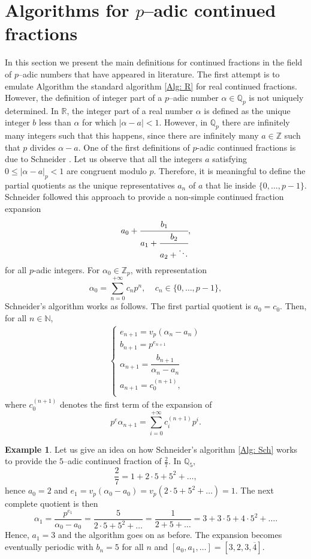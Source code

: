 \documentclass[12pt, reqno]{amsart}
\theoremstyle{plain}
\theoremstyle{definition}
\newtheorem{Example}[Theorem]{Example}
\begin{document}
\section{Algorithms for $p$--adic continued fractions}\label{Sec: algo}
In this section we present the main definitions for continued fractions in the field of $p$--adic numbers that have appeared in literature. The first attempt is to emulate Algorithm  the standard algorithm \eqref{Alg: R} for real continued fractions. However, the definition of integer part of a $p$--adic number $\alpha\in\mathbb{Q}_p$ is not uniquely determined. In $\mathbb{R}$, the integer part of a real number $\alpha$ is defined as the unique integer $b$ less than $\alpha$ for which $|\alpha-a|<1$. However, in $\mathbb{Q}_p$ there are infinitely many integers such that this happens, since there are infinitely many $a\in\mathbb{Z}$ such that $p$ divides $\alpha-a$. One of the first definitions of $p$-adic continued fractions is due to Schneider \cite{SCH}. Let us observe that all the integers $a$ satisfying $0\leq |\alpha -a|_p<1$ are congruent modulo $p$. Therefore, it is meaningful to define the partial quotients as the unique representatives $a_n$ of $a$ that lie inside $\{0,\ldots,p-1\}$. Schneider followed this approach to provide a non-simple continued fraction expansion
 \begin{equation}
a_0+\cfrac{b_1}{a_1+\cfrac{b_2}{a_2+\ddots}},
\end{equation}
for all $p$-adic integers. For $\alpha_0\in \mathbb{Z}_{p}$, with representation
\[\alpha_0=\sum\limits_{n=0}^{+\infty}c_np^n, \ \ \ \ \ c_n\in\{0,\ldots,p-1\},\]
Schneider's algorithm works as follows. The first partial quotient is $a_0=c_0$. Then, for all $n\in\mathbb{N}$,
\begin{align} 
\begin{cases}\label{Alg: Sch}
e_{n+1}=v_p(\alpha_{n}-a_n)\\
b_{n+1}=p^{e_{n+1}}\\
\alpha_{n+1}=\dfrac{b_{n+1}}{\alpha_n-a_n}\\
a_{n+1}=c_0^{(n+1)},\\
\end{cases}
\end{align}
where $c_0^{(n+1)}$ denotes the first term of the expansion of
\[p^e\alpha_{n+1}=\sum\limits_{i=0}^{+\infty}c_i^{(n+1)}p^i.\]
\begin{Example}
Let us give an idea on how Schneider's algorithm \eqref{Alg: Sch} works to provide the $5$--adic continued fraction of $\frac{2}{7}$. In $\mathbb{Q}_5$,
\[\frac{2}{7}=1+2\cdot5+5^2+\ldots,\]
hence $a_0=2$ and $e_1=v_p(\alpha_0-a_0)=v_p(2\cdot5+5^2+\ldots)=1$.
The next complete quotient is then
\[\alpha_1=\frac{p^{e_1}}{\alpha_0-a_0}=\frac{5}{2\cdot5+5^2+\ldots}=\frac{1}{2+5+\ldots}=3+3\cdot5+4\cdot 5^2+\ldots.\]
Hence, $a_1=3$ and the algorithm goes on as before. The expansion becomes eventually periodic with $b_n=5$ for all $n$ and $[a_0,a_1,\ldots]=[3,2,3,\overline{4}]$.
\end{Example}
\end{document}
